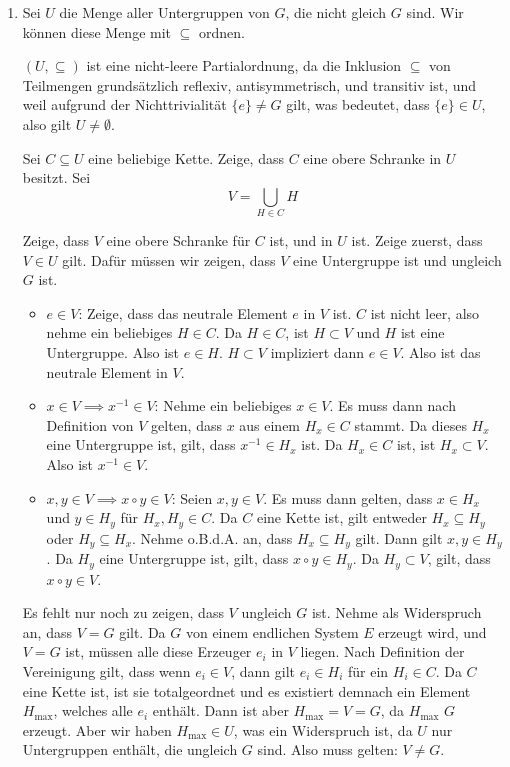 \documentclass[12pt]{article}
\begin{document}
\begin{enumerate}[label=\alph*)]
    \item Sei $U$ die Menge aller Untergruppen von $G$, die nicht gleich $G$ sind. Wir können diese Menge mit $\subseteq$ ordnen.
    
    $(U, \subseteq)$ ist eine nicht-leere Partialordnung, da die Inklusion $\subseteq$ von Teilmengen grundsätzlich reflexiv, antisymmetrisch, und transitiv ist, und weil aufgrund der Nichttrivialität $\{e\} \neq G$ gilt, was bedeutet, dass $\{e\} \in U$, also gilt $U \neq \emptyset$.

    Sei $C \subseteq U$ eine beliebige Kette. Zeige, dass $C$ eine obere Schranke in $U$ besitzt. Sei
    $$
        V = \bigcup\limits_{H \in C} H
    $$

    Zeige, dass $V$ eine obere Schranke für $C$ ist, und in $U$ ist. Zeige zuerst, dass $V \in U$ gilt. Dafür müssen wir zeigen, dass $V$ eine Untergruppe ist und ungleich $G$ ist.

    \begin{itemize}
        \item \underline{$e \in V$}: Zeige, dass das neutrale Element $e$ in $V$ ist. $C$ ist nicht leer, also nehme ein beliebiges $H \in C$. Da $H \in C$, ist $H \subset V$ und $H$ ist eine Untergruppe. Also ist $e \in H$. $H \subset V$ impliziert dann $e \in V$. Also ist das neutrale Element in $V$.
        \item \underline{$x \in V \implies x^{-1} \in V$}: Nehme ein beliebiges $x \in V$. Es muss dann nach Definition von $V$ gelten, dass $x$ aus einem $H_x \in C$ stammt. Da dieses $H_x$ eine Untergruppe ist, gilt, dass $x^{-1} \in H_x$ ist. Da $H_x \in C$ ist, ist $H_x \subset V$. Also ist $x^{-1} \in V$.
        \item \underline{$x, y \in V \implies x \circ y \in V$}: Seien $x, y \in V$. Es muss dann gelten, dass $x \in H_x$ und $y \in H_y$ für $H_x, H_y \in C$. Da $C$ eine Kette ist, gilt entweder $H_x \subseteq H_y$ oder $H_y \subseteq H_x$. Nehme o.B.d.A. an, dass $H_x \subseteq H_y$ gilt. Dann gilt $x, y \in H_y$. Da $H_y$ eine Untergruppe ist, gilt, dass $x \circ y \in H_y$. Da $H_y \subset V$, gilt, dass $x \circ y \in V$.
    \end{itemize}

    Es fehlt nur noch zu zeigen, dass $V$ ungleich $G$ ist. Nehme als Widerspruch an, dass $V = G$ gilt. Da $G$ von einem endlichen System $E$ erzeugt wird, und $V = G$ ist, müssen alle diese Erzeuger $e_i$ in $V$ liegen. Nach Definition der Vereinigung gilt, dass wenn $e_i \in V$, dann gilt $e_i \in H_i$ für ein $H_i \in C$. Da $C$ eine Kette ist, ist sie totalgeordnet und es existiert demnach ein Element $H_\text{max}$, welches alle $e_i$ enthält. Dann ist aber $H_\text{max} = V = G$, da $H_\text{max}$ $G$ erzeugt. Aber wir haben $H_\text{max} \in U$, was ein Widerspruch ist, da $U$ nur Untergruppen enthält, die ungleich $G$ sind. Also muss gelten: $V \neq G$.


\end{enumerate}
\end{document}

